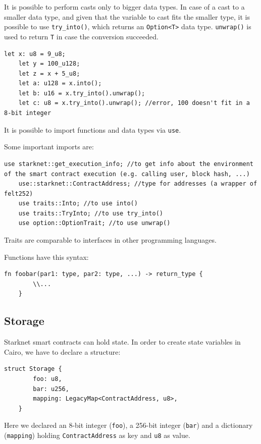 \documentclass[12pt]{article}
\begin{document}
It is possible to perform casts only to bigger data types. In case of a cast to a smaller data type, and given that the variable to cast fits the smaller type, it is possible to use \verb|try_into()|, which returns an \verb|Option<T>| data type. \verb|unwrap()| is used to return \verb|T| in case the conversion succeeded.
\begin{lstlisting}[language=cairo]
    let x: u8 = 9_u8;
    let y = 100_u128;
    let z = x + 5_u8;
    let a: u128 = x.into();
    let b: u16 = x.try_into().unwrap();
    let c: u8 = x.try_into().unwrap(); //error, 100 doesn't fit in a 8-bit integer
\end{lstlisting}

It is possible to import functions and data types via \verb|use|.

Some important imports are:
\begin{lstlisting}[language=cairo]
    use starknet::get_execution_info; //to get info about the environment of the smart contract execution (e.g. calling user, block hash, ...)
    use::starknet::ContractAddress; //type for addresses (a wrapper of felt252)
    use traits::Into; //to use into()
    use traits::TryInto; //to use try_into()
    use option::OptionTrait; //to use unwrap()
\end{lstlisting}

Traits are comparable to interfaces in other programming languages.

Functions have this syntax:
\begin{lstlisting}[language=cairo]
    fn foobar(par1: type, par2: type, ...) -> return_type {
        \\...
    }
\end{lstlisting}

\subsection{Storage} \label{subsection:storage}
Starknet smart contracts can hold state. In order to create state variables in Cairo, we have to declare a structure:
\begin{lstlisting}[language=cairo]
    struct Storage {
        foo: u8,
        bar: u256,
        mapping: LegacyMap<ContractAddress, u8>,
    }
\end{lstlisting}

Here we declared an 8-bit integer (\verb|foo|), a 256-bit integer (\verb|bar|) and a dictionary (\verb|mapping|) holding \verb|ContractAddress| as key and \verb|u8| as value.
\end{document}
